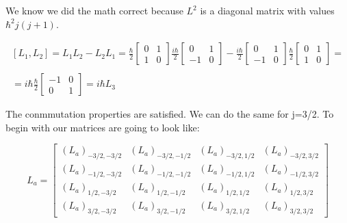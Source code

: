 We know we did the math correct because $L^2$ is a diagonal matrix with values $\hbar^2j(j+1)$.

\begin{equation}
  \begin{array}{c}
    [L_1,L_2] = L_1L_2-L_2L_1 = \frac{\hbar}{2}\left[
      \begin{matrix}
        0 & 1\\
        1 & 0
      \end{matrix}\right]\frac{i\hbar}{2}
      \left[\begin{matrix}
        0 & 1\\
        -1 & 0
      \end{matrix}\right] - \frac{i\hbar}{2}\left[\begin{matrix}
        0 & 1\\
        -1 & 0
      \end{matrix}\right]\frac{\hbar}{2}\left[
        \begin{matrix}
          0 & 1\\
          1 & 0
        \end{matrix}\right] =
      \\

      \\
      = i \hbar \frac{\hbar}{2}\left[\begin{matrix}
        -1 & 0\\
        0 & 1
      \end{matrix}\right] = i \hbar L_3
  \end{array}
\end{equation}

The conmmutation properties are satisfied. We can do the same for j=3/2. To begin with our matrices are going to look like:

\begin{equation}
  L_a =
    \left[\begin{matrix}
      (L_a)_{-3/2,-3/2} & (L_a)_{-3/2,-1/2} & (L_a)_{-3/2,1/2} & (L_a)_{-3/2,3/2}\\
      (L_a)_{-1/2,-3/2} & (L_a)_{-1/2,-1/2} & (L_a)_{-1/2,1/2} & (L_a)_{-1/2,3/2}\\
      (L_a)_{1/2,-3/2} & (L_a)_{1/2,-1/2} & (L_a)_{1/2,1/2} & (L_a)_{1/2,3/2}\\
      (L_a)_{3/2,-3/2} & (L_a)_{3/2,-1/2} & (L_a)_{3/2,1/2} & (L_a)_{3/2,3/2}
    \end{matrix}\right]
\end{equation}

